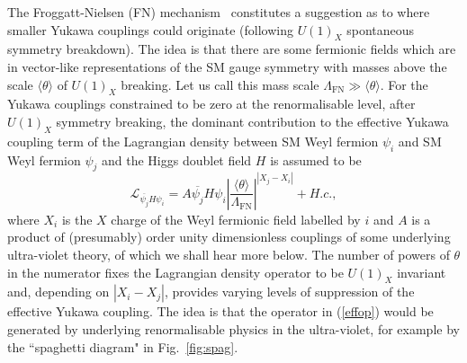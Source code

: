 \documentclass[11pt,letterpaper]{article}
\begin{document}
The Froggatt-Nielsen (FN) mechanism~\cite{Froggatt:1978nt} constitutes a
suggestion as to where smaller Yukawa couplings could originate (following
$U(1)_X$ spontaneous symmetry breakdown). The idea is that there are some fermionic fields which are in vector-like representations of the SM gauge symmetry with masses above the scale $\langle \theta \rangle$ of $U(1)_X$ breaking.
Let us call this mass scale $\Lambda_{\text{FN}} \gg \langle \theta \rangle$. For the Yukawa couplings constrained to be zero at the renormalisable level, after $U(1)_X$ symmetry breaking, the dominant contribution to the effective Yukawa coupling term of the Lagrangian density between SM Weyl fermion $\psi_i$ and SM Weyl fermion $\psi_j$ and the Higgs doublet field $H$ is assumed to be 
\begin{equation}
    {\mathcal L}_{\overline{\psi_j} H \psi_i} = A \overline{\psi_j} H \psi_i
    \left| \frac{\langle \theta
      \rangle}{\Lambda_{\text{FN}}}\right|^{|X_j-X_i|} + H.c.,
    \label{effop}
\end{equation}
where $X_i$ is the $X$ charge of the Weyl fermionic field labelled by $i$ and $A$ is a product of (presumably) order unity dimensionless couplings of some underlying ultra-violet theory, of which we shall hear more below.  The number of powers of $\theta$ in the numerator fixes the Lagrangian density operator to be $U(1)_X$ invariant and, depending on $|X_i-X_j|$, provides varying levels of suppression of the effective Yukawa coupling. 
The idea is that the operator in (\ref{effop}) would be generated by underlying renormalisable physics in the ultra-violet, for example by the ``spaghetti diagram" in Fig.~\ref{fig:spag}.
\end{document}

